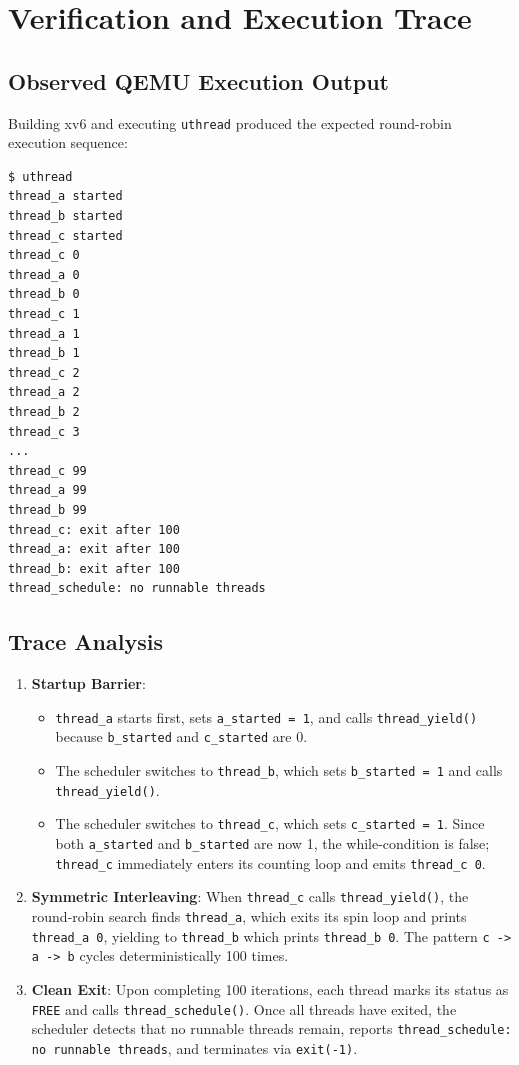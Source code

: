 \documentclass[12pt,a4paper]{article}
\begin{document}
\section{Verification and Execution Trace}

\subsection{Observed QEMU Execution Output}
Building xv6 and executing \texttt{uthread} produced the expected round-robin execution sequence:

\begin{lstlisting}[style=consolestyle, caption={QEMU Console Output from \texttt{uthread}}]
$ uthread
thread_a started
thread_b started
thread_c started
thread_c 0
thread_a 0
thread_b 0
thread_c 1
thread_a 1
thread_b 1
thread_c 2
thread_a 2
thread_b 2
thread_c 3
...
thread_c 99
thread_a 99
thread_b 99
thread_c: exit after 100
thread_a: exit after 100
thread_b: exit after 100
thread_schedule: no runnable threads
\end{lstlisting}

\subsection{Trace Analysis}
\begin{enumerate}
    \item \textbf{Startup Barrier}:
    \begin{itemize}
        \item \texttt{thread\_a} starts first, sets \texttt{a\_started = 1}, and calls \texttt{thread\_yield()} because \texttt{b\_started} and \texttt{c\_started} are 0.
        \item The scheduler switches to \texttt{thread\_b}, which sets \texttt{b\_started = 1} and calls \texttt{thread\_yield()}.
        \item The scheduler switches to \texttt{thread\_c}, which sets \texttt{c\_started = 1}. Since both \texttt{a\_started} and \texttt{b\_started} are now 1, the while-condition is false; \texttt{thread\_c} immediately enters its counting loop and emits \texttt{thread\_c 0}.
    \end{itemize}
    \item \textbf{Symmetric Interleaving}:
    When \texttt{thread\_c} calls \texttt{thread\_yield()}, the round-robin search finds \texttt{thread\_a}, which exits its spin loop and prints \texttt{thread\_a 0}, yielding to \texttt{thread\_b} which prints \texttt{thread\_b 0}. The pattern \texttt{c -> a -> b} cycles deterministically 100 times.
    \item \textbf{Clean Exit}:
    Upon completing 100 iterations, each thread marks its status as \texttt{FREE} and calls \texttt{thread\_schedule()}. Once all threads have exited, the scheduler detects that no runnable threads remain, reports \texttt{thread\_schedule: no runnable threads}, and terminates via \texttt{exit(-1)}.
\end{enumerate}
\end{document}
